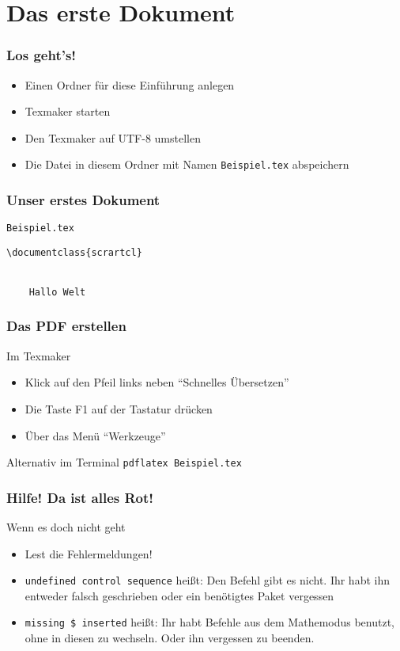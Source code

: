 \section{Das erste Dokument}

\begin{frame}
    \frametitle{Los geht's!}
    \begin{itemize}
        \item Einen Ordner für diese Einführung anlegen
        \item Texmaker starten
        \item Den Texmaker auf UTF-8 umstellen
        \item Die Datei in diesem Ordner mit Namen \texttt{Beispiel.tex} abspeichern
    \end{itemize}
\end{frame}


\begin{frame}[fragile]
    \frametitle{Unser erstes Dokument}
    \begin{block}{\texttt{Beispiel.tex}}
    \begin{verbatim}
\documentclass{scrartcl}


    Hallo Welt

\end{verbatim}
    \end{block}
\end{frame}


\begin{frame}[fragile]
    \frametitle{Das PDF erstellen}
    \begin{block}{Im Texmaker}
        \begin{itemize}
            \item Klick auf den Pfeil links neben \enquote{Schnelles Übersetzen}
            \item Die Taste F1 auf der Tastatur drücken
            \item Über das Menü \enquote{Werkzeuge}
        \end{itemize}
    \end{block}
    
    \bigskip
    \begin{block}{Alternativ im Terminal}
        \verb+pdflatex Beispiel.tex+
    \end{block}
\end{frame}


\begin{frame}
    \frametitle{Hilfe! Da ist alles Rot!}
    \begin{alertblock}{Wenn es doch nicht geht}
	    \begin{itemize}
	        \item Lest die Fehlermeldungen!
	        \item \texttt{undefined control sequence} heißt: Den Befehl gibt es nicht. Ihr habt ihn entweder falsch geschrieben oder ein benötigtes Paket vergessen
	        \item \texttt{missing \$ inserted} heißt: Ihr habt Befehle aus dem Mathemodus benutzt, ohne in diesen zu wechseln. Oder ihn vergessen zu beenden.
	    \end{itemize}
    \end{alertblock}
\end{frame}


